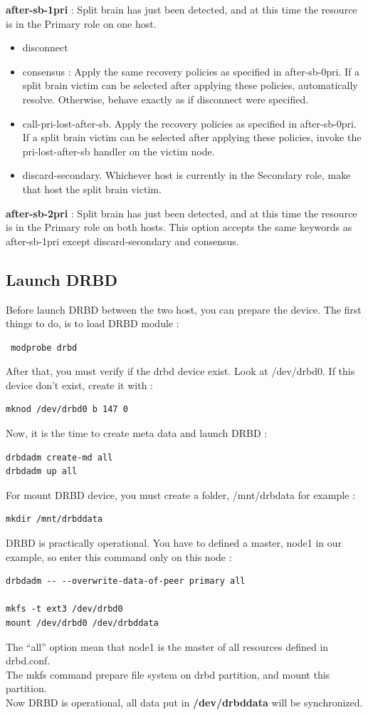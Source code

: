 \documentclass[a4paper,10pt]{report}
\begin{document}
\textbf{after-sb-1pri} : Split brain has just been detected, and at this time the resource is in the Primary role on one host.
\begin{itemize}
\item disconnect 
\item consensus : Apply the same recovery policies as specified in after-sb-0pri. If a split brain victim can be selected after applying these policies, automatically resolve. Otherwise, behave exactly as if disconnect were specified.
\item call-pri-lost-after-sb. Apply the recovery policies as specified in after-sb-0pri. If a split brain victim can be selected after applying these policies, invoke the pri-lost-after-sb handler on the victim node.
\item discard-secondary. Whichever host is currently in the Secondary role, make that host the split brain victim.
\end{itemize}
\textbf{after-sb-2pri} : Split brain has just been detected, and at this time the resource is in the Primary role on both hosts. This option accepts the same keywords as after-sb-1pri except discard-secondary and consensus.

\subsection{Launch DRBD}
Before launch DRBD between the two host, you can prepare the device. The first things to do, is to load DRBD module :
\begin{lstlisting}
 modprobe drbd
\end{lstlisting}
After that, you must verify if the drbd device exist. Look at /dev/drbd0. If this device don't exist, create it with :
\begin{lstlisting}
mknod /dev/drbd0 b 147 0
\end{lstlisting}
Now, it is the time to create meta data and launch DRBD :
\begin{lstlisting}
drbdadm create-md all
drbdadm up all
\end{lstlisting}
For mount DRBD device, you must create a folder, /mnt/drbdata for example :
\begin{lstlisting}
mkdir /mnt/drbddata
\end{lstlisting}
DRBD is practically operational. You have to defined a master, node1 in our example, so enter this command only on this node :
\begin{lstlisting}
drbdadm -- --overwrite-data-of-peer primary all

mkfs -t ext3 /dev/drbd0
mount /dev/drbd0 /dev/drbddata
\end{lstlisting}
The ``all'' option mean that node1 is the master of all resources defined in drbd.conf.\\
The mkfs command prepare file system on drbd partition, and mount this partition.\\
Now DRBD is operational, all data put in \textbf{/dev/drbddata} will be synchronized.
\end{document}
